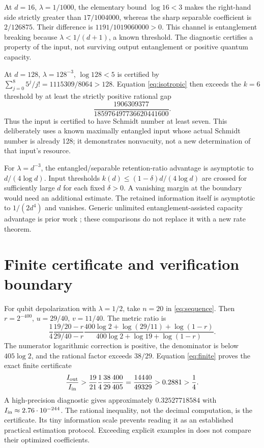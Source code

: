 \documentclass[11pt]{article}
\begin{document}
At $d=16$, $\lambda=1/1000$, the elementary bound $\log16<3$ makes the right-hand side strictly greater than $17/1004000$, whereas the sharp separable coefficient is $2/126875$. Their difference is $1191/1019060000>0$. This channel is entanglement breaking because $\lambda<1/(d+1)$, a known threshold. The diagnostic certifies a property of the input, not surviving output entanglement or positive quantum capacity.

At $d=128$, $\lambda=128^{-3}$, $\log128<5$ is certified by $\sum_{j=0}^8 5^j/j!=1115309/8064>128$. Equation \eqref{eq:isotropic} then exceeds the $k=6$ threshold by at least the strictly positive rational gap
\[
 \frac{1906309377}{185976497736620441600}.
\]
Thus the input is certified to have Schmidt number at least seven. This deliberately uses a known maximally entangled input whose actual Schmidt number is already 128; it demonstrates nonvacuity, not a new determination of that input's resource.

For $\lambda=d^{-3}$, the entangled/separable retention-ratio advantage is asymptotic to $d/(4\log d)$. Input thresholds $k(d)\le(1-\delta)d/(4\log d)$ are crossed for sufficiently large $d$ for each fixed $\delta>0$. A vanishing margin at the boundary would need an additional estimate. The retained information itself is asymptotic to $1/(2d^4)$ and vanishes. Generic unlimited entanglement-assisted capacity advantage is prior work \cite{bsst}; these comparisons do not replace it with a new rate theorem.

\section{Finite certificate and verification boundary}
For qubit depolarization with $\lambda=1/2$, take $n=20$ in \eqref{eq:sequence}. Then $r=2^{-400}$, $u=29/40$, $v=11/40$. The metric ratio is
\[
 \frac14\frac{19/20-r}{29/40-r}
 \frac{400\log2+\log(29/11)+\log(1-r)}{400\log2+\log19+\log(1-r)}.
\]
The numerator logarithmic correction is positive, the denominator is below $405\log2$, and the rational factor exceeds $38/29$. Equation \eqref{eq:finite} proves the exact finite certificate
\[
 \frac{I_{\rm out}}{I_{\rm in}}>\frac{19}{21}\frac14\frac{38}{29}\frac{400}{405}
 =\frac{14440}{49329}>0.2881>\frac14.
\]
A high-precision diagnostic gives approximately $0.32527718584$ with $I_{\rm in}\approx2.76\cdot10^{-244}$. The rational inequality, not the decimal computation, is the certificate. Its tiny information scale prevents reading it as an established practical estimation protocol. Exceeding explicit examples in \cite{conditional} does not compare their optimized coefficients.
\end{document}
